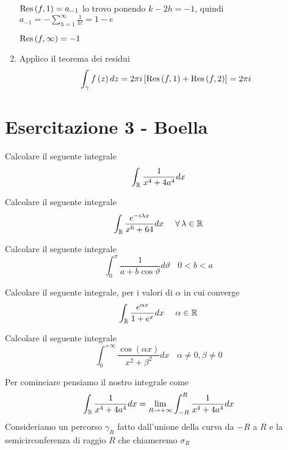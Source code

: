 \begin{enumerate}
$\operatorname{Res} \left(f, 1\right) = a_{- 1}$ lo trovo ponendo $k - 2h = -1$, quindi $a_{- 1} = - \sum\limits^{\infty}_{h = 1}\frac{1}{h!} = 1 - e$

$\operatorname{Res} \left(f, \infty \right) = - 1$
\item Applico il teorema dei residui
\begin{equation*}
\int\nolimits_{\gamma} f\left(z\right) dz = 2\pi i\left[\operatorname{Res} \left(f, 1\right) + \operatorname{Res} \left(f, 2\right)\right] = 2\pi i
\end{equation*}
\end{enumerate}
\chapter{Esercitazione 3 - Boella}
\ParteEsercizi
\Esercizio{}

Calcolare il seguente integrale
\begin{equation*}
\int_{\mathbb{R}}\frac{1}{x^{4} + 4a^{4}} dx
\end{equation*}
\Esercizio{}

Calcolare il seguente integrale
\begin{equation*}
\int_{\RR}\frac{e^{- i\lambda x}}{x^{6} + 64} dx\ \ \ \ \forall \lambda \in \RR 
\end{equation*}
\Esercizio{}

Calcolare il seguente integrale
\begin{equation*}
\int^{\pi}_{0}\frac{1}{a + b\cos \vartheta} d\vartheta \ \ \ \ 0 < b < a
\end{equation*}
\Esercizio{}

Calcolare il seguente integrale, per i valori di $\alpha $ in cui converge
\begin{equation*}
\int_{\mathbb{R}}\frac{e^{\alpha x}}{1 + e^{x}} dx\ \ \ \ \alpha \in \mathbb{R} 
\end{equation*}
\Esercizio{}

Calcolare il seguente integrale
\begin{equation*}
\int^{+ \infty}_{0}\frac{\cos\left(\alpha x\right)}{x^{2} + \beta^{2}} dx\ \ \ \ \alpha \neq 0, \beta \neq 0
\end{equation*}
\ParteSoluzioni
\Soluzione

Per cominciare pensiamo il nostro integrale come
\begin{equation*}
\int_{\mathbb{R}}\frac{1}{x^{4} + 4a^{4}} dx = \lim\limits_{R\rightarrow + \infty}\int^{R}_{- R}\frac{1}{x^{4} + 4a^{4}} dx
\end{equation*}
Consideriamo un percorso $\gamma_{R}$ fatto dall'unione della curva da $ - R$ a $R$ e la semicirconferenza di raggio $R$ che chiameremo $\sigma_{R}$


